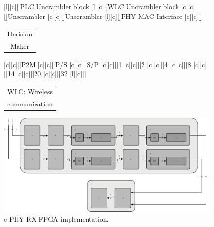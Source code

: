 \documentclass[mathserif]{beamer}
\begin{document}
\begin{frame}
\begin{overprint}
{\begin{figure}[htb]
				[l][c][\sizeLetter]{PLC Uncrambler block}
				[l][c][\sizeLetter]{WLC Uncrambler block}
				[c][c][\sizeLetter]{Unscrambler}
				[c][c][\sizeLetter]{Unscrambler}
				[l][c][\sizeLetter]{PHY-MAC Interface}
				[c][c][\sizeLetter]{\begin{tabular}{c}
						Decision\\Maker
				\end{tabular}}
				[c][c][\sizeLetter]{P2M}
				[c][c][\sizeLetter]{P/S}
				[c][c][\sizeLetter]{S/P}
				[c][c][\sizeLetter]{1}	
				[c][c][\sizeLetter]{2}	
				[c][c][\sizeLetter]{4}	
				[c][c][\sizeLetter]{8}	
				[c][c][\sizeLetter]{14}
				[c][c][\sizeLetter]{20}	
				[c][c][\sizeLetter]{32}	
				[l][c][\sizeLetter]{\begin{tabular}{c}
						WLC: Wireless\\communication
				\end{tabular}}	
				\includegraphics[width=0.9\linewidth]{figuras/phy_rx_cut2}
				\caption{e-PHY RX FPGA implementation.}
			\end{figure}
		}
	\end{overprint}	
\end{frame}
\end{document}
